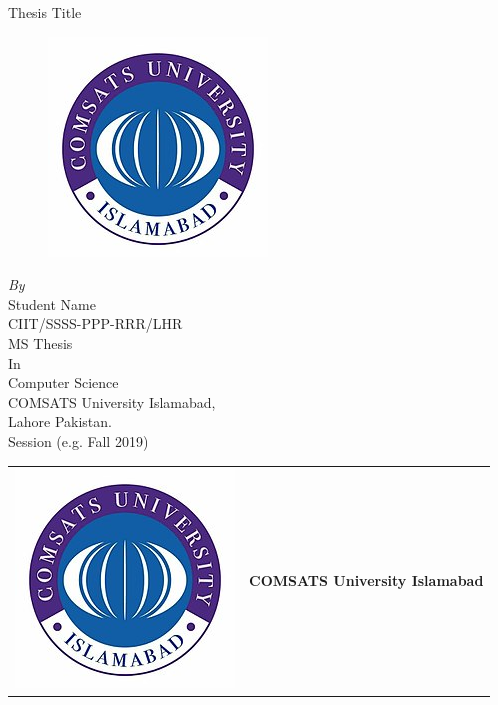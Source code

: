 \begin{titlepage}

\begin{center}
\LARGE Thesis Title \\
\vspace{5pt}
\begin{figure}[h]
	\centering
	\includegraphics[scale=1.2]{images/COMSATS_Logo.png}
\end{figure}

\vspace{0.4in} {\large \textit{By}}\\
\vspace{0.1in} {\large Student Name}\\
\vspace{0.1in} {\large CIIT/SSSS-PPP-RRR/LHR}\\
\vspace{0.1in} {\large MS Thesis}\\
\vspace{0.1in} {\large In}\\
\vspace{0.1in} {\large Computer Science}\\

\vspace{2.0cm} \LARGE COMSATS University Islamabad,\\ Lahore Pakistan. \\ 
 \vspace{0.7cm } \large Session (e.g. Fall 2019)
\vspace{4cm }
\end{center}
\pagebreak

\begin{table}[ht!]
	\centering
	\begin{tabular}{ p{1.5cm}  p{12cm} }
		\vspace{-1cm} \includegraphics[scale=0.25]{images/COMSATS_Logo.png} 
		& {\fontsize{16}{16} \textbf{COMSATS University Islamabad}} \\ 
	\end{tabular}
\end{table}


\end{titlepage}
